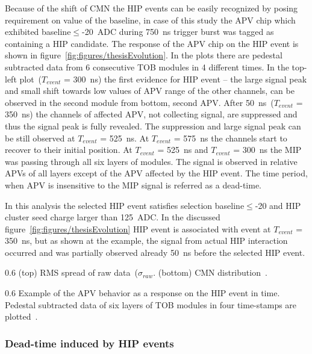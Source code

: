 Because of the shift of CMN the HIP events can be easily recognized by posing requirement on value of the baseline, in case of this study the APV chip which exhibited baseline$\leq$-20~ADC during 750~ns trigger burst was tagged as containing a  HIP candidate. The response of the APV chip on the HIP event is shown in figure~\ref{fig:figures/thesisEvolution}. In the plots there are pedestal subtracted data from 6 consecutive TOB modules in 4 different times. In the top-left plot~($T_{event}$ = 300~ns) the first evidence for HIP event -- the large signal peak and small shift towards low values of APV range of the other channels, can be observed in the second module from bottom, second APV. After 50~ns~($T_{event}$ = 350~ns) the channels of affected APV, not collecting signal, are suppressed and thus the signal peak is fully revealed. The suppression and large signal peak can be still observed at $T_{event}$ = 525~ns. At $T_{event}$ = 575~ns the channels start to recover to their initial position. At $T_{event}$ = 525~ns and $T_{event}$ = 300~ns the MIP was passing through all six layers of modules. The signal is observed in relative APVs of all layers except of the APV affected by the HIP event. The time period, when APV is insensitive to the MIP signal is referred as a dead-time.

In this analysis the selected HIP event satisfies selection baseline$\leq$-20 and HIP cluster seed charge larger than 125~ADC.  In the discussed figure~\ref{fig:figures/thesisEvolution} HIP event is associated with event at $T_{event}$ = 350~ns, but as shown at the example, the signal from actual HIP interaction occurred and was partially observed already 50~ns before the selected HIP event.

                 {0.6}       %
                 {(top) RMS spread of raw data~($\sigma_{raw}$. (bottom) CMN distribution~\cite{Bainbridge:2004jc}.} %


                 {0.6}       %
                 {Example of the APV behavior as a response on the HIP event in time. Pedestal subtracted data of six layers of TOB modules in four time-stamps are plotted~\cite{Bainbridge:2004jc}.} %



\subsubsection{Dead-time induced by HIP events}

